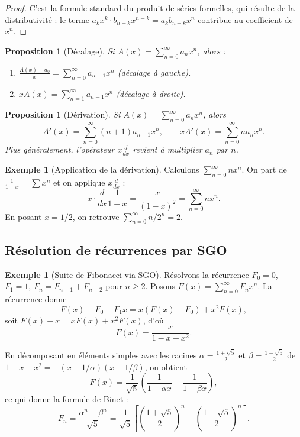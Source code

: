 \documentclass[12pt,a4paper,openany]{book}
\theoremstyle{definition}
\newtheorem{exemple}[definition]{Exemple}
\theoremstyle{plain}
\newtheorem{proposition}[definition]{Proposition}
\theoremstyle{remark}
\begin{document}
\begin{proof}
C'est la formule standard du produit de séries formelles, qui résulte de la
distributivité : le terme $a_k x^k \cdot b_{n-k} x^{n-k} = a_k b_{n-k} x^n$
contribue au coefficient de $x^n$.
\end{proof}

\begin{proposition}[Décalage]
\label{prop:ogf-decalage}
Si $A(x) = \sum_{n=0}^\infty a_n x^n$, alors :
\begin{enumerate}[label=\roman*)]
  \item $\displaystyle\frac{A(x) - a_0}{x} = \sum_{n=0}^{\infty} a_{n+1} x^n$
    \quad (décalage à gauche).
  \item $x A(x) = \sum_{n=1}^{\infty} a_{n-1} x^n$
    \quad (décalage à droite).
\end{enumerate}
\end{proposition}

\begin{proposition}[Dérivation]
\label{prop:ogf-derivation}
Si $A(x) = \sum_{n=0}^\infty a_n x^n$, alors
\[
  A'(x) = \sum_{n=0}^{\infty} (n+1) a_{n+1} x^n,
  \qquad
  x A'(x) = \sum_{n=0}^{\infty} n a_n x^n.
\]
Plus généralement, l'opérateur $x\frac{d}{dx}$ revient à multiplier
$a_n$ par $n$.
\end{proposition}

\begin{exemple}[Application de la dérivation]
\label{ex:ogf-derivation}
Calculons $\sum_{n=0}^\infty n x^n$. On part de $\frac{1}{1-x} = \sum x^n$
et on applique $x\frac{d}{dx}$ :
\[
  x \cdot \frac{d}{dx}\frac{1}{1-x} = \frac{x}{(1-x)^2} = \sum_{n=0}^{\infty} n x^n.
\]
En posant $x = 1/2$, on retrouve $\sum_{n=0}^\infty n/2^n = 2$.
\end{exemple}

\subsection{Résolution de récurrences par SGO}
\label{sec:ogf-recurrences}

\begin{exemple}[Suite de Fibonacci via SGO]
\label{ex:fibonacci-ogf}
Résolvons la récurrence $F_0 = 0$, $F_1 = 1$, $F_{n} = F_{n-1} + F_{n-2}$
pour $n \geqslant 2$. Posons $F(x) = \sum_{n=0}^\infty F_n x^n$.
La récurrence donne
\[
  F(x) - F_0 - F_1 x = x(F(x) - F_0) + x^2 F(x),
\]
soit $F(x) - x = xF(x) + x^2 F(x)$, d'où
\[
  F(x) = \frac{x}{1 - x - x^2}.
\]

En décomposant en éléments simples avec les racines
$\alpha = \frac{1+\sqrt{5}}{2}$ et $\beta = \frac{1-\sqrt{5}}{2}$
de $1 - x - x^2 = -(x - 1/\alpha)(x - 1/\beta)$, on obtient
\[
  F(x) = \frac{1}{\sqrt{5}}\left(\frac{1}{1-\alpha x} - \frac{1}{1-\beta x}\right),
\]
ce qui donne la formule de Binet :
\[
  F_n = \frac{\alpha^n - \beta^n}{\sqrt{5}}
      = \frac{1}{\sqrt{5}}\left[\left(\frac{1+\sqrt{5}}{2}\right)^{\!n}
        - \left(\frac{1-\sqrt{5}}{2}\right)^{\!n}\right].
\]
\end{exemple}
\end{document}
